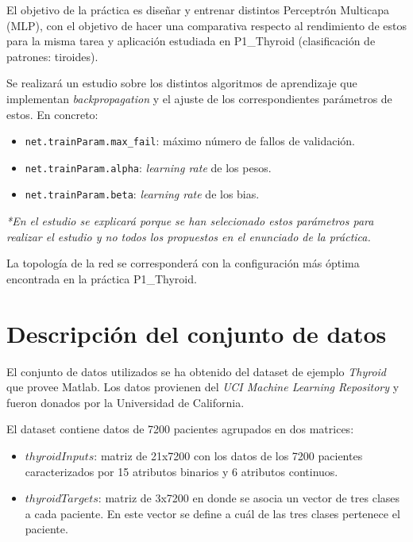 \documentclass[a4paper,12pt,titlepage]{article}
\begin{document}
El objetivo de la práctica es diseñar y entrenar distintos Perceptrón Multicapa (MLP), con el objetivo de hacer una comparativa respecto al rendimiento de estos para la misma tarea y aplicación estudiada en P1\_Thyroid (clasificación de patrones: tiroides).

Se realizará un estudio sobre los distintos algoritmos de aprendizaje que implementan \textit{backpropagation} y el ajuste de los correspondientes parámetros de estos. En concreto:

\begin{itemize}[noitemsep]
	\item \lstinline|net.trainParam.max_fail|: máximo número de fallos de validación.
	\item \lstinline|net.trainParam.alpha|: \textit{learning rate} de los pesos.
	\item \lstinline|net.trainParam.beta|: \textit{learning rate} de los bias.
\end{itemize}

\textit{*En el estudio se explicará porque se han selecionado estos parámetros para realizar el estudio y no todos los propuestos en el enunciado de la práctica.}

La topología de la red se corresponderá con la configuración más óptima encontrada en la práctica P1\_Thyroid.

\section{Descripción del conjunto de datos}

El conjunto de datos utilizados se ha obtenido del dataset de ejemplo \emph{Thyroid} que provee Matlab. Los datos provienen del \emph{UCI Machine Learning Repository} \citep{Asuncion+Newman:2007} y fueron donados por la Universidad de California.

El dataset contiene datos de 7200 pacientes agrupados en dos matrices:

\begin{itemize}[noitemsep]
	\item $thyroidInputs$: matriz de 21x7200 con los datos de los 7200 pacientes caracterizados por 15 atributos binarios y 6 atributos continuos.
	\item $thyroidTargets$: matriz de 3x7200 en donde se asocia un vector de tres clases a cada paciente. En este vector se define a cuál de las tres clases pertenece el paciente.
\end{itemize}
\end{document}

